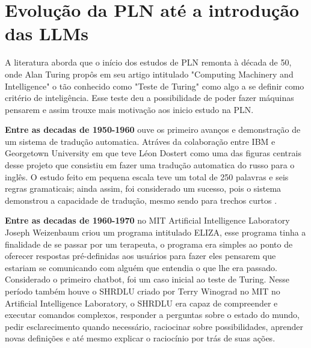 \section{Evolução da PLN até a introdução das LLMs}
A literatura aborda que o início dos estudos de PLN remonta à década de 50, onde Alan Turing propôs em seu artigo intitulado "Computing Machinery and Intelligence" o tão conhecido como "Teste de Turing" como algo a se definir como critério de inteligência\cite{jurafsky2023slp}. Esse teste deu a possibilidade de poder fazer máquinas pensarem e assim trouxe mais motivação aos inicio estudo na PLN.

\textbf{Entre as decadas de 1950-1960} ouve os primeiro avanços e demonstração de um sistema de tradução automatica. Atráves da colaboração entre IBM e Georgetown University em que teve Léon Dostert como uma das figuras centrais desse projeto que consistiu em fazer uma tradução automatica do russo para o inglês. O estudo feito em pequena escala teve um total de 250 palavras e seis regras gramaticais; ainda assim, foi considerado um sucesso, pois o sistema demonstrou a capacidade de tradução, mesmo sendo para trechos curtos \cite{historyofinformationFirstPublic}.

\textbf{Entre as decadas de 1960-1970} no MIT Artificial Intelligence Laboratory Joseph Weizenbaum criou um programa intitulado ELIZA, esse programa tinha a finalidade de se passar por um terapeuta, o programa era simples ao ponto de oferecer respostas pré-definidas aos usuários para fazer eles pensarem que estariam se comunicando com alguém que entendia o que lhe era passado. Considerado o primeiro chatbot, foi um caso inicial ao teste de Turing\cite{elizachat}. Nesse período também houve o SHRDLU criado por Terry Winograd no MIT no Artificial Intelligence Laboratory, o SHRDLU era capaz de compreender e executar comandos complexos, responder a perguntas sobre o estado do mundo, pedir esclarecimento quando necessário, raciocinar sobre possibilidades, aprender novas definições e até mesmo explicar o raciocínio por trás de suas ações\cite{shrdlu2025}.

